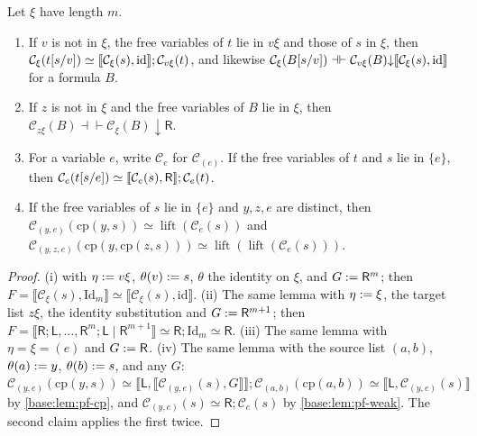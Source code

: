 \begin{corollary}
\label{base:cor:pf-subst}
Let $\xi$ have length $m$.
\begin{enumerate}[label=\textup{(\roman*)}]
\item If $v$ is not in $\xi$, the free variables of $t$ lie in $v\xi$ and
 those of $s$ in $\xi$, then
 $\mathcal C_\xi(t[s/v])\simeq[\![\mathcal C_\xi(s),\mathrm{id}]\!];
 \mathcal C_{v\xi}(t)$, and likewise
 $\mathcal C_\xi(B[s/v])\dashv\vdash
 \mathcal C_{v\xi}(B){\downarrow}[\![\mathcal C_\xi(s),\mathrm{id}]\!]$
 for a formula $B$.
\item If $z$ is not in $\xi$ and the free variables of $B$ lie in $\xi$, then
 $\mathcal C_{z\xi}(B)\dashv\vdash\mathcal C_\xi(B){\downarrow}\mathsf R$.
\item For a variable $e$, write $\mathcal C_e$ for $\mathcal C_{(e)}$.  If
 the free variables of $t$ and $s$ lie in $\{e\}$, then
 $\mathcal C_e(t[s/e])\simeq[\![\mathcal C_e(s),\mathsf R]\!];
 \mathcal C_e(t)$.
\item If the free variables of $s$ lie in $\{e\}$ and $y,z,e$ are distinct,
 then $\mathcal C_{(y,e)}(\mathrm{cp}(y,s))\simeq\operatorname{lift}(\mathcal C_e(s))$
 and $\mathcal C_{(y,z,e)}(\mathrm{cp}(y,\mathrm{cp}(z,s)))\simeq
 \operatorname{lift}(\operatorname{lift}(\mathcal C_e(s)))$.
\end{enumerate}
\end{corollary}

\begin{proof}
(i)  with $\eta\mathrel{:=} v\xi$, $\theta(v)\mathrel{:=} s$,
$\theta$ the identity on $\xi$, and $G\mathrel{:=}\mathsf R^{m}$; then
$F=\llbracket\mathcal C_\xi(s),\mathrm{Id}_m\rrbracket\simeq
\llbracket\mathcal C_\xi(s),\mathrm{id}\rrbracket$.  (ii) The same lemma with
$\eta\mathrel{:=}\xi$, the target list $z\xi$, the identity substitution and
$G\mathrel{:=}\mathsf R^{m+1}$; then
$F=\llbracket\mathsf R;\mathsf L,\dots,\mathsf R^{m};\mathsf L\mid\mathsf R^{m+1}\rrbracket
\simeq\mathsf R;\mathrm{Id}_m\simeq\mathsf R$.  (iii) The same lemma with
$\eta=\xi=(e)$ and $G\mathrel{:=}\mathsf R$.  (iv) The same lemma with the source
list $(a,b)$, $\theta(a)\mathrel{:=} y$, $\theta(b)\mathrel{:=} s$, and any $G$:
$\mathcal C_{(y,e)}(\mathrm{cp}(y,s))\simeq
\llbracket\mathsf L,\llbracket\mathcal C_{(y,e)}(s),G\rrbracket\rrbracket;
\mathcal C_{(a,b)}(\mathrm{cp}(a,b))\simeq\llbracket\mathsf L,\mathcal C_{(y,e)}(s)\rrbracket$
by \cref{base:lem:pf-cp}, and
$\mathcal C_{(y,e)}(s)\simeq\mathsf R;\mathcal C_e(s)$ by
\cref{base:lem:pf-weak}.  The second claim applies the first twice.
\end{proof}

